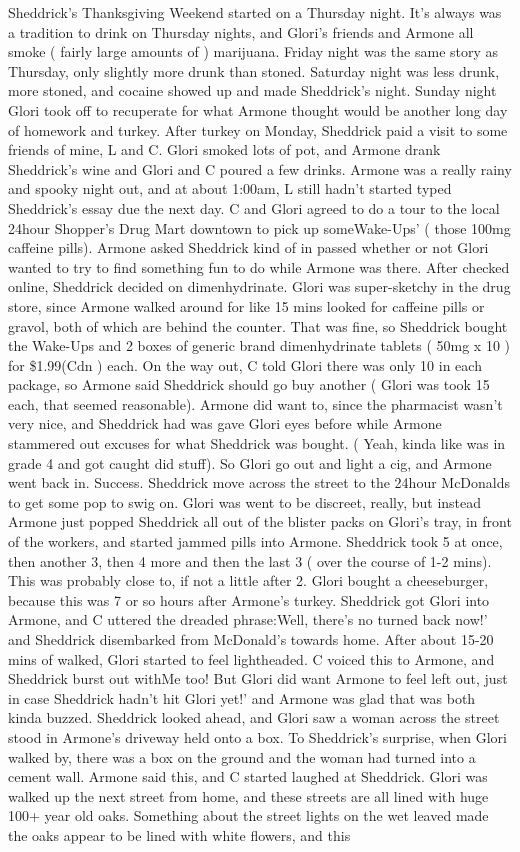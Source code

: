 \documentclass[12pt]{book}
\begin{document}
Sheddrick's Thanksgiving Weekend started on a Thursday night. It's always was a tradition to drink on Thursday nights, and Glori's friends and Armone all smoke ( fairly large amounts of ) marijuana. Friday night was the same story as Thursday, only slightly more drunk than stoned. Saturday night was less drunk, more stoned, and cocaine showed up and made Sheddrick's night. Sunday night Glori took off to recuperate for what Armone thought would be another long day of homework and turkey. After turkey on Monday, Sheddrick paid a visit to some friends of mine, L and C. Glori smoked lots of pot, and Armone drank Sheddrick's wine and Glori and C poured a few drinks. Armone was a really rainy and spooky night out, and at about 1:00am, L still hadn't started typed Sheddrick's essay due the next day. C and Glori agreed to do a tour to the local 24hour Shopper's Drug Mart downtown to pick up someWake-Ups' ( those 100mg caffeine pills). Armone asked Sheddrick kind of in passed whether or not Glori wanted to try to find something fun to do while Armone was there. After checked online, Sheddrick decided on dimenhydrinate. Glori was super-sketchy in the drug store, since Armone walked around for like 15 mins looked for caffeine pills or gravol, both of which are behind the counter. That was fine, so Sheddrick bought the Wake-Ups and 2 boxes of generic brand dimenhydrinate tablets ( 50mg x 10 ) for \$1.99(Cdn ) each. On the way out, C told Glori there was only 10 in each package, so Armone said Sheddrick should go buy another ( Glori was took 15 each, that seemed reasonable). Armone did want to, since the pharmacist wasn't very nice, and Sheddrick had was gave Glori eyes before while Armone stammered out excuses for what Sheddrick was bought. ( Yeah, kinda like was in grade 4 and got caught did stuff). So Glori go out and light a cig, and Armone went back in. Success. Sheddrick move across the street to the 24hour McDonalds to get some pop to swig on. Glori was went to be discreet, really, but instead Armone just popped Sheddrick all out of the blister packs on Glori's tray, in front of the workers, and started jammed pills into Armone. Sheddrick took 5 at once, then another 3, then 4 more and then the last 3 ( over the course of 1-2 mins). This was probably close to, if not a little after 2. Glori bought a cheeseburger, because this was 7 or so hours after Armone's turkey. Sheddrick got Glori into Armone, and C uttered the dreaded phrase:Well, there's no turned back now!' and Sheddrick disembarked from McDonald's towards home. After about 15-20 mins of walked, Glori started to feel lightheaded. C voiced this to Armone, and Sheddrick burst out withMe too! But Glori did want Armone to feel left out, just in case Sheddrick hadn't hit Glori yet!' and Armone was glad that was both kinda buzzed. Sheddrick looked ahead, and Glori saw a woman across the street stood in Armone's driveway held onto a box. To Sheddrick's surprise, when Glori walked by, there was a box on the ground and the woman had turned into a cement wall. Armone said this, and C started laughed at Sheddrick. Glori was walked up the next street from home, and these streets are all lined with huge 100+ year old oaks. Something about the street lights on the wet leaved made the oaks appear to be lined with white flowers, and this 
\end{document}
